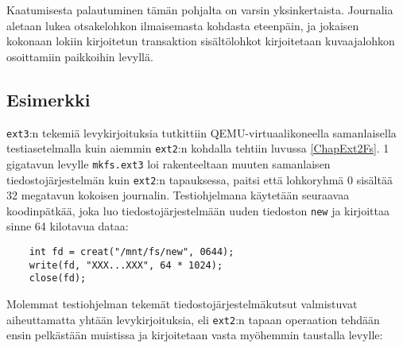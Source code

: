 Kaatumisesta palautuminen tämän pohjalta on varsin yksinkertaista.
Journalia aletaan lukea otsakelohkon ilmaisemasta kohdasta eteenpäin,
ja jokaisen kokonaan lokiin kirjoitetun transaktion sisältölohkot kirjoitetaan kuvaajalohkon osoittamiin paikkoihin levyllä.

\subsection{Esimerkki}
\texttt{ext3}:n tekemiä levykirjoituksia tutkittiin QEMU-virtuaalikoneella samanlaisella testiasetelmalla kuin aiemmin \texttt{ext2}:n kohdalla tehtiin luvussa \ref{ChapExt2Fs}.
1 gigatavun levylle \texttt{mkfs.ext3} loi rakenteeltaan muuten samanlaisen tiedostojärjestelmän kuin \texttt{ext2}:n tapauksessa,
paitsi että lohkoryhmä 0 sisältää 32 megatavun kokoisen journalin.
Testiohjelmana käytetään seuraavaa koodinpätkää,
joka luo tiedostojärjestelmään uuden tiedoston \texttt{new} ja kirjoittaa sinne 64 kilotavua dataa:

\begin{verbatim}
    int fd = creat("/mnt/fs/new", 0644);
    write(fd, "XXX...XXX", 64 * 1024);
    close(fd);
\end{verbatim}

Molemmat testiohjelman tekemät tiedostojärjestelmäkutsut valmistuvat aiheuttamatta yhtään levykirjoituksia,
eli \texttt{ext2}:n tapaan operaation tehdään ensin pelkästään muistissa ja kirjoitetaan vasta myöhemmin taustalla levylle:

